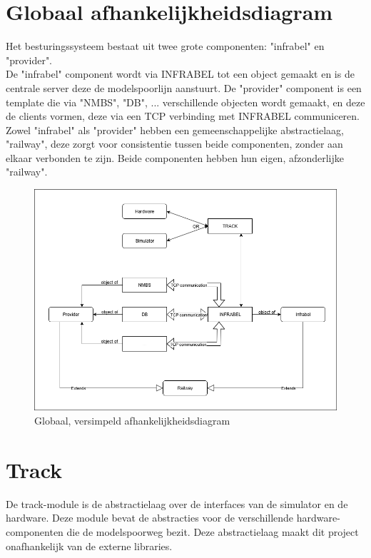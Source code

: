 \documentclass[a4paper, 11pt]{article}
\newcommand{\<}{\scriptsize\textless\normalsize}
\renewcommand{\>}{\scriptsize\textgreater\normalsize}
\begin{document}
\section{Globaal afhankelijkheidsdiagram} %
Het besturingssysteem bestaat uit twee grote componenten: "infrabel" en "provider".\\De "infrabel" component wordt via INFRABEL tot een object gemaakt en is de centrale server deze de modelspoorlijn aanstuurt. De "provider" component is een template die via "NMBS", "DB", ... verschillende objecten wordt gemaakt, en deze de clients vormen, deze via een TCP verbinding met INFRABEL communiceren.\\
Zowel "infrabel" als "provider" hebben een gemeenschappelijke abstractielaag, "railway", deze zorgt voor consistentie tussen beide componenten, zonder aan elkaar verbonden te zijn. Beide componenten hebben hun eigen, afzonderlijke "railway".
\begin{figure}[h]
	\begin{center}
		\includegraphics[scale=.5]{Afhankelijkheidsdiagrammen/global.png}
		\caption{Globaal, versimpeld afhankelijkheidsdiagram}
	\end{center}
\end{figure}

\newpage
\section{Track} %
De track-module is de abstractielaag over de interfaces van de simulator en de hardware. Deze module bevat de abstracties voor de verschillende hardware-componenten die de modelspoorweg bezit. Deze abstractielaag maakt dit project onafhankelijk van de externe libraries.
\end{document}
